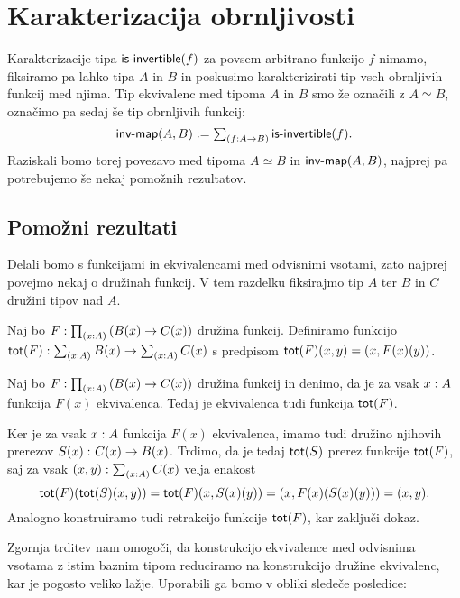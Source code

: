 \section{Karakterizacija obrnljivosti}

Karakterizacije tipa \(\textnormal{\textsf{is-invertible}}(f)\) za povsem arbitrano funkcijo \(f\) nimamo, fiksiramo pa lahko tipa \(A\) in \(B\) in poskusimo karakterizirati tip vseh obrnljivih funkcij med njima. Tip ekvivalenc med tipoma \(A\) in \(B\) smo že označili z \(A \simeq B\), označimo pa sedaj še tip obrnljivih funkcij:
\[\textnormal{\textsf{inv-map}}(A, B) := \textstyle \sum_{\left( f : A \to B \right)} \textnormal{\textsf{is-invertible}}(f).\]
Raziskali bomo torej povezavo med tipoma \(A \simeq B\) in \(\textnormal{\textsf{inv-map}}(A, B)\), najprej pa potrebujemo še nekaj pomožnih rezultatov.

\subsection{Pomožni rezultati}

Delali bomo s funkcijami in ekvivalencami med odvisnimi vsotami, zato najprej povejmo nekaj o družinah funkcij. V tem razdelku fiksirajmo tip \(A\) ter \(B\) in \(C\) družini tipov nad \(A\).

\begin{definicija}
  Naj bo \(F : \textstyle \prod_{\left( x : A \right)} \left(B(x) \to C(x)\right)\) družina funkcij.
  Definiramo funkcijo
  \(\textnormal{\textsf{tot}}(F) : \textstyle \sum_{\left( x : A \right)} B(x) \to \textstyle \sum_{\left( x : A \right)} C(x)\) s predpisom
  \(\textnormal{\textsf{tot}}(F)(x, y) = (x, F(x)(y))\).
\end{definicija}

\begin{trditev}
  Naj bo \(F : \textstyle \prod_{\left( x : A \right)} \left(B(x) \to C(x)\right)\) družina funkcij
  in denimo, da je za vsak \(x : A\) funkcija \(F(x)\) ekvivalenca. Tedaj je
  ekvivalenca tudi funkcija \(\textnormal{\textsf{tot}}(F)\).
\end{trditev}

\begin{dokaz}
  Ker je za vsak \(x : A\) funkcija \(F(x)\) ekvivalenca, imamo tudi družino njihovih prerezov \(S(x) \,\colon C(x) \to B(x)\).
  Trdimo, da je tedaj \(\textnormal{\textsf{tot}}(S)\) prerez funkcije \(\textnormal{\textsf{tot}}(F)\), saj
  za vsak \((x, y) : \textstyle \sum_{\left( x : A \right)} C(x)\) velja enakost
  \[\textnormal{\textsf{tot}}(F)(\textnormal{\textsf{tot}}(S)(x, y)) = \textnormal{\textsf{tot}}(F)(x, S(x)(y)) = (x, F(x)(S(x)(y))) = (x, y).\]
  Analogno konstruiramo tudi retrakcijo funkcije \(\textnormal{\textsf{tot}}(F)\), kar zaključi dokaz.
\end{dokaz}

Zgornja trditev nam omogoči, da konstrukcijo ekvivalence med odvisnima
vsotama z istim baznim tipom reduciramo na konstrukcijo družine ekvivalenc,
kar je pogosto veliko lažje. Uporabili ga bomo v obliki sledeče posledice:

